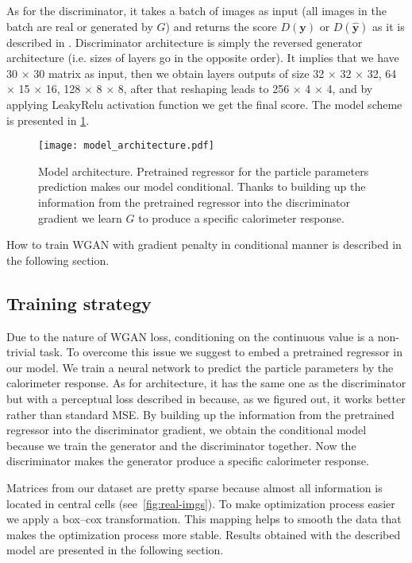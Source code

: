 \documentclass{webofc}
\begin{document}
As for the discriminator, it takes a batch of images as input (all images in the batch are real or generated by $G$) and returns the score $D(\textbf{y})$ or $D(\hat{\textbf{y}})$ as it is described in \cite{arjovsky2017wasserstein}. Discriminator architecture is simply the reversed generator architecture (i.e. sizes of layers go in the opposite order). It implies that we have 30 $\times$ 30 matrix as input, then we obtain layers outputs of size 32 $\times$ 32 $\times$ 32, 64 $\times$ 15 $\times$ 16, 128 $\times$ 8 $\times$  8, after that reshaping leads to 256 $\times$ 4 $\times$ 4, and by applying LeakyRelu activation function we get the final score. The model scheme is presented in \cref{fig:model}.

\begin{figure}
\centering
\texttt{[image: model\_architecture.pdf]}
\caption{Model architecture. Pretrained regressor for the particle parameters prediction makes our model conditional. Thanks to building up the information from the pretrained regressor into the discriminator gradient we learn $G$ to produce a specific calorimeter response.}\label{fig:model}
\end{figure}

How to train WGAN with gradient penalty in conditional manner is described in the following section.

\subsection{Training strategy} \label{training_strategy}
Due to the nature of WGAN loss, conditioning on the continuous value is a non-trivial task. To overcome this issue we suggest to embed a pretrained regressor in our model. We train a neural network to predict the particle parameters by the calorimeter response. As for architecture, it has the same one as the discriminator but with a perceptual loss described in \cite{johnson2016perceptual} because, as we figured out, it works better rather than standard MSE. By building up the information from the pretrained regressor into the discriminator gradient, we obtain the conditional model because we train the generator and the discriminator together. Now the discriminator makes the generator produce a specific calorimeter response.

Matrices from our dataset are pretty sparse because almost all information is located in central cells (see~\cref{fig:real-imgs}). To make optimization process easier we apply a box--cox transformation. This mapping helps to smooth the data that makes the optimization process more stable.
Results obtained with the described model are presented in the following section.
\end{document}
